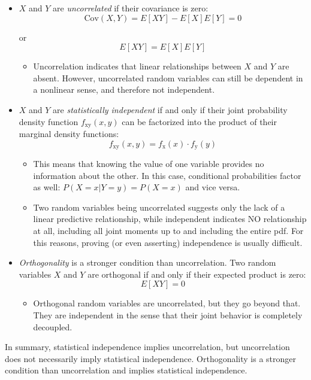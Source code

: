 \documentclass[12pt]{book}
\theoremstyle{definition}
\begin{document}
\begin{itemize}

   
   \item $X$ and $Y$ are \emph{uncorrelated} if their covariance is zero:
     \[
     \text{Cov}(X, Y) = E[XY] - E[X]E[Y] = 0
     \]

     or
     \[
     E[XY] = E[X]E[Y]
     \]
     \begin{itemize}
         \item Uncorrelation indicates that linear relationships between $X$ and $Y$ are absent. However, uncorrelated random variables can still be dependent in a nonlinear sense, and therefore not independent.

     \end{itemize}
       \item $X$ and $Y$ are \emph{statistically independent} if and only if their joint probability density function $f_\mathrm{xy}(x, y)$ can be factorized into the product of their marginal density functions:
     \[
     f_\mathrm{xy}(x, y) = f_\mathrm{x}(x) \cdot f_\mathrm{y}(y)
     \]
     \begin{itemize}
         \item This means that knowing the value of one variable provides no information about the other. In this case, conditional probabilities factor as well: $P(X = x | Y = y) = P(X = x)$ and vice versa.
             \item Two random variables being uncorrelated suggests only the lack of a linear predictive relationship, while independent indicates NO relationship at all, including all joint moments up to and including the entire pdf. For this reasons, proving (or even asserting) independence is usually difficult.
     \end{itemize}
     
   \item \emph{Orthogonality} is a stronger condition than uncorrelation. Two random variables $X$ and $Y$ are orthogonal if and only if their expected product is zero:
     \[
     E[XY] = 0
     \]
     \begin{itemize}
         \item Orthogonal random variables are uncorrelated, but they go beyond that. They are independent in the sense that their joint behavior is completely decoupled.
     \end{itemize}
\end{itemize}

In summary, statistical independence implies uncorrelation, but uncorrelation does not necessarily imply statistical independence. Orthogonality is a stronger condition than uncorrelation and implies statistical independence.
\end{document}
